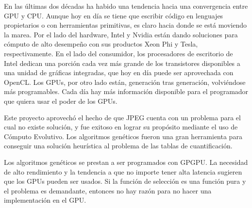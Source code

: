 En las últimas dos décadas ha habido una tendencia hacia una convergencia entre
GPU y CPU. Aunque hoy en día se tiene que escribir código en lenguajes
propietarios o con herramientas primitivas, es claro hacia donde se está
moviendo la marea. Por el lado del hardware, Intel y Nvidia están dando
soluciones para cómputo de alto desempeño con sus productos Xeon Phi y Tesla,
respectivamente. En el lado del consumidor, los procesadores de escritorio de
Intel dedican una porción cada vez más grande de los transistores disponibles a
una unidad de gráficas integradas, que hoy en día puede ser aprovechada con
OpenCL. Los GPUs, por otro lado están, generación tras generación, volviéndose
más programables. Cada día hay más información disponible para el programador
que quiera usar el poder de los GPUs.

Este proyecto aprovechó el hecho de que JPEG cuenta con un problema para el
cual no existe solución, y fue exitoso en lograr su propósito mediante el uso
de \gls{Cómputo Evolutivo}. Los algoritmos genéticos fueron una gran herramienta
para conseguir una solución heurística al problema de las tablas de
cuantificación.

Los algoritmos genéticos se prestan a ser programados con \gls{GPGPU}. La
necesidad de alto rendimiento y la tendencia a que no importe tener alta
latencia sugieren que los GPUs pueden ser usados. Si la función de selección es
una función pura y el problema es demandante, entonces no hay razón para no
hacer una implementación en el GPU.
